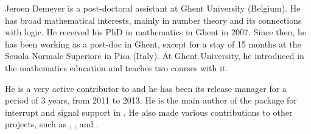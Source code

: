 \begin{participant}[type=leadPI,PM=30,gender=male]{Jeroen Demeyer} %
is a post-doctoral assistant at Ghent University (Belgium).
He has broad mathematical interests, mainly in number theory and its
connections with logic.
He received his PhD in mathematics in Ghent in 2007.
Since then, he has been working as a post-doc in Ghent,
except for a stay of 15 months at the Scuola Normale Superiore in Pisa (Italy).
At Ghent University, he introduced \Sage{} in the mathematics education
and teaches two courses with it.

He is a very active contributor to \Sage{} and he has been its
release manager for a period of 3 years, from 2011 to 2013.
He is the main author of the  package
for interrupt and signal support in \Cython{}.
He also made various contributions to other projects,
such as \PariGP{}, \Cython{}, and \Jupyter{}.
\end{participant}

